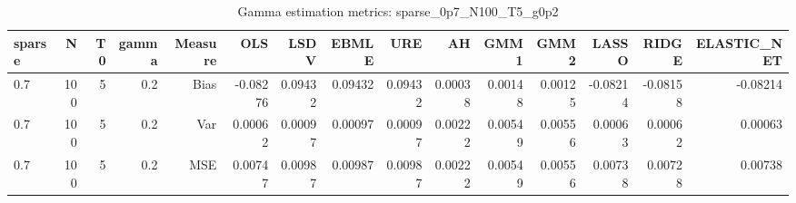 \begin{table}[!htbp]\centering
\caption{Gamma estimation metrics: sparse_0p7_N100_T5_g0p2}
\label{tab:table1_sparse_0p7_N100_T5_g0p2}
\begin{tabular}{lrrrrrrrrrrrrrr}
\hline
sparse & N & T0 & gamma & Measure & OLS & LSDV & EBMLE & URE & AH & GMM1 & GMM2 & LASSO & RIDGE & ELASTIC_NET \\
\hline
0.7 & 100 & 5 & 0.2 & Bias & -0.08276 & 0.09432 & 0.09432 & 0.09432 & 0.00038 & 0.00148 & 0.00125 & -0.08214 & -0.08158 & -0.08214 \\
0.7 & 100 & 5 & 0.2 & Var & 0.00062 & 0.00097 & 0.00097 & 0.00097 & 0.00222 & 0.00549 & 0.00556 & 0.00063 & 0.00062 & 0.00063 \\
0.7 & 100 & 5 & 0.2 & MSE & 0.00747 & 0.00987 & 0.00987 & 0.00987 & 0.00222 & 0.00549 & 0.00556 & 0.00738 & 0.00728 & 0.00738 \\
\hline
\end{tabular}
\end{table}


